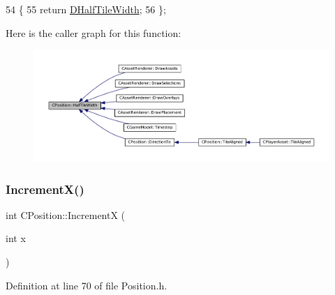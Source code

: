 \begin{DoxyCode}
54                                   \{
55             \textcolor{keywordflow}{return} \hyperlink{classCPosition_a3227e835d9008346e9d91bdad2380f14}{DHalfTileWidth};  
56         \};
\end{DoxyCode}
Here is the caller graph for this function\+:
\nopagebreak
\begin{figure}[H]
\begin{center}
\leavevmode
\includegraphics[width=350pt]{classCPosition_a4b799a0fb78ddd8bbd8548980e2458af_icgraph}
\end{center}
\end{figure}
\hypertarget{classCPosition_aa5955d67d5ab7ca74d80cb7303b6eaa9}{}\label{classCPosition_aa5955d67d5ab7ca74d80cb7303b6eaa9} 
\subsubsection{\texorpdfstring{Increment\+X()}{IncrementX()}}
{\footnotesize\ttfamily int C\+Position\+::\+IncrementX (\begin{DoxyParamCaption}\item[{int}]{x }\end{DoxyParamCaption})\hspace{0.3cm}{\ttfamily [inline]}}



Definition at line 70 of file Position.\+h.


